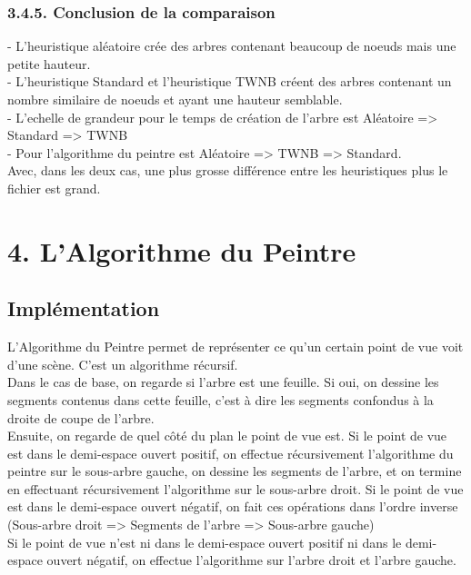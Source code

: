 \documentclass[a4paper,12pt]{report}	%
\begin{document}
    {\subsubsection*{3.4.5. Conclusion de la comparaison}}
     - L'heuristique aléatoire crée des arbres contenant beaucoup de noeuds mais une petite hauteur.\\
\indent - L'heuristique Standard et l'heuristique TWNB créent des arbres contenant un nombre similaire de noeuds et ayant une hauteur semblable. \\
\indent - L'echelle de grandeur pour le temps de création de l'arbre est Aléatoire => Standard => TWNB \\
\indent - Pour l'algorithme du peintre est Aléatoire => TWNB => Standard.\\
 Avec, dans les deux cas, une plus grosse différence entre les heuristiques plus le fichier est grand.
    
    \newpage
  
    {\section*{4. L'Algorithme du Peintre}}
    
    {\subsection*{Implémentation}}
    L'Algorithme du Peintre permet de représenter ce qu'un certain point de vue voit d'une scène. C'est un algorithme récursif.\\
    Dans le cas de base, on regarde si l'arbre est une feuille. Si oui, on dessine les segments contenus dans cette feuille, c'est à dire les segments confondus à la droite de coupe de l'arbre.\\
    Ensuite, on regarde de quel côté du plan le point de vue est. Si le point de vue est dans le demi-espace ouvert positif, on effectue récursivement l'algorithme du peintre sur le sous-arbre gauche, on dessine les segments de l'arbre, et on termine en effectuant récursivement l'algorithme sur le sous-arbre droit. Si le point de vue est dans le demi-espace ouvert négatif, on fait ces opérations dans l'ordre inverse (Sous-arbre droit => Segments de l'arbre => Sous-arbre gauche)\\
    Si le point de vue n'est ni dans le demi-espace ouvert positif ni dans le demi-espace ouvert négatif, on effectue l'algorithme sur l'arbre droit et l'arbre gauche.\\
    
\end{document}
